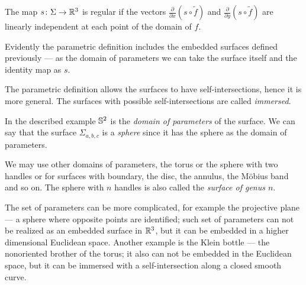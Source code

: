 The map $s\colon\Sigma \to \mathbb{R}^3$ is regular
if the vectors $\frac{\partial}{\partial x}(s\circ \tilde{f})$ and $\frac{\partial}{\partial y}(s\circ \tilde{f})$ are linearly independent at each point of the domain of $f$.

Evidently the parametric definition includes the embedded surfaces defined previously --- as the domain of parameters we can take the surface itself and the identity map as $s$.

 The parametric definition allows the surfaces to have self-intersections, hence it is more general.
The surfaces with possible self-intersections are  called \emph{immersed}.

In the described example $\mathbb{S}^2$ is the \emph{domain of parameters} of the surface.
We can say that the surface $\Sigma_{a,b,c}$ is a \emph{sphere} since it has the sphere as the domain of parameters.

We may use other domains of parameters, the torus or the sphere with two handles or for surfaces with boundary, the disc, the annulus, the M\"obius band and so on.
The sphere with $n$ handles is also called the \emph{surface of genus $n$}.

The set of parameters can be more complicated, for example the projective plane --- a sphere where opposite points are identified; such set of parameters can not be realized as an embedded surface in $\mathbb{R}^3$, but it can be embedded in a higher dimensional Euclidean space.
Another example is the Klein bottle --- the  nonoriented brother of the torus;
it also can not be embedded in the Euclidean space, but it can be immersed with a self-intersection along a closed smooth curve.










